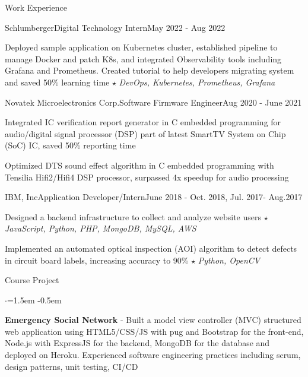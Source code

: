 \documentclass{resume_short} %
\begin{document}
\begin{rSection}{Work Experience}
    \begin{rSubsection3}{Schlumberger}{Digital Technology Intern}{May 2022 - Aug 2022}
        \item Deployed sample application on Kubernetes cluster, established pipeline to manage Docker and patch K8s, and integrated Observability tools including Grafana and Prometheus. Created tutorial to help developers migrating system and saved 50\% learning time $\star$ {\em DevOps, Kubernetes, Prometheus, Grafana}
    \end{rSubsection3}
    \begin{rSubsection3}{Novatek Microelectronics Corp.}{Software Firmware Engineer}{Aug 2020 - June 2021}
        \item Integrated IC verification report generator in C embedded programming for audio/digital signal processor (DSP) part of latest SmartTV System on Chip (SoC) IC, saved 50\% reporting time
        \item Optimized DTS sound effect algorithm in C embedded programming with Tensilia Hifi2/Hifi4 DSP processor, surpassed 4x speedup for audio processing
    \end{rSubsection3}
    \begin{rSubsection3}{IBM, Inc}{Application Developer/Intern}{June 2018 - Oct. 2018, Jul. 2017- Aug.2017}
        \item Designed a backend infrastructure to collect and analyze website users $\star$ {\em JavaScript, Python, PHP, MongoDB, MySQL, AWS}
        \item Implemented an automated optical inspection (AOI) algorithm to 
              detect defects in circuit board labels, increasing accuracy to 90\% $\star$ {\em Python, OpenCV}
    \end{rSubsection3}
\end{rSection}


\begin{rSection}{Course Project}
    \begin{list}{$\cdot$}{\leftmargin=1.5em}
        \itemsep -0.5em \vspace{-0.25em} %
        \item {\bf Emergency Social Network} - Built a model view controller (MVC) structured web application using HTML5/CSS/JS with pug and Bootstrap for the front-end, Node.js with ExpressJS for the backend, MongoDB for the database and deployed on Heroku. 
        Experienced software engineering practices including scrum, design patterns, unit testing, CI/CD
    \end{list}
\end{rSection}
\end{document}
